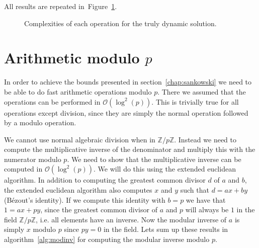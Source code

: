 \documentclass[a4paper,oneside,article,11pt]{memoir}
\begin{document}
All results are repeated in~Figure~\ref{fig:truly-comp}.

\begin{figure}[h]
\caption{Complexities of each operation for the truly dynamic solution.}
\label{fig:truly-comp}
\end{figure}




\chapter{Arithmetic modulo $p$}
\label{chap:prime}
In order to achieve the bounds presented in section~\ref{chap:sankowski} we need to be able to do fast arithmetic operations modulo $p$. There we assumed that the operations can be performed in $\mathcal{O}(\log^2(p))$. This is trivially true for all operations except division, since they are simply the normal operation followed by a modulo operation.

We cannot use normal algebraic division when in $\mathbb{Z}/p\mathbb{Z}$. Instead we need to compute the multiplicative inverse of the denominator and multiply this with the numerator modulo $p$. We need to show that the multiplicative inverse can be computed in $\mathcal{O}(\log^2(p))$. We will do this using the extended euclidean algorithm. In addition to computing the greatest common divisor $d$ of $a$ and $b$, the extended euclidean algorithm also computes $x$ and $y$ such that $d = ax+by$ (Bézout's identity). If we compute this identity with $b = p$ we have that $1 = ax+py$, since the greatest common divisor of $a$ and $p$ will always be $1$ in the field $\mathbb{Z}/p\mathbb{Z}$, i.e. all elements have an inverse. Now the modular inverse of $a$ is simply $x$ modulo $p$ since $py = 0$ in the field. Lets sum up these results in algorithm~\ref{alg:modinv} for computing the modular inverse modulo $p$.
\end{document}
